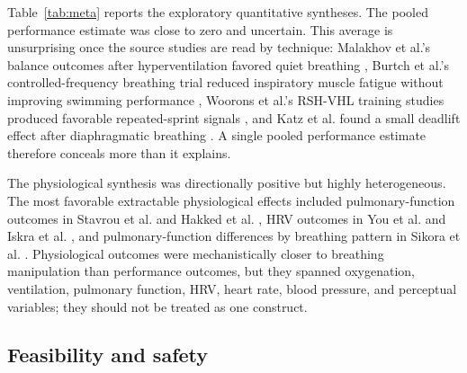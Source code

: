 \documentclass[12pt,a4paper]{article}
\begin{document}
Table~\ref{tab:meta} reports the exploratory quantitative syntheses. The pooled performance estimate was close to zero and uncertain. This average is unsurprising once the source studies are read by technique: Malakhov et al.'s balance outcomes after hyperventilation favored quiet breathing \parencite{malakhov_m_and_makarenkova_e_and_melnikov_a_influence_2014}, Burtch et al.'s controlled-frequency breathing trial reduced inspiratory muscle fatigue without improving swimming performance \parencite{burtch_controlled_2017}, Woorons et al.'s RSH-VHL training studies produced favorable repeated-sprint signals \parencite{woorons_physiological_2019,woorons_x_and_faucher_c_and_dufour_sp_and_brocherie_f_and_robach_p_and_connes_p_and_brugniaux_jv_and_verges_s_and_gaston_af_and_millet_g_and_dupuy_o_and_pichon_a_hypoventilation_2024}, and Katz et al. found a small deadlift effect after diaphragmatic breathing \parencite{katz_ns_and_rossow_lm_and_fahs_ca_acute_2026}. A single pooled performance estimate therefore conceals more than it explains.

The physiological synthesis was directionally positive but highly heterogeneous. The most favorable extractable physiological effects included pulmonary-function outcomes in Stavrou et al. and Hakked et al. \parencite{stavrou_v_and_toubekis_ag_and_karetsi_e_changes_2015,hakked_cs_and_balakrishnan_r_and_krishnamurthy_mn_yogic_2017}, HRV outcomes in You et al. and Iskra et al. \parencite{you_m_and_laborde_s_and_ackermann_s_and_borges_u_and_dosseville_f_and_mosley_e_influence_2024,iskra_m_and_laborde_s_and_poppa_t_and_salvotti_c_and_weinand_e_and_raab_m_and_voigt_l_specifying_2026}, and pulmonary-function differences by breathing pattern in Sikora et al. \parencite{sikora_m_and_mikolajczyk_r_and_lakomy_o_and_karpinski_j_and_zebrowska_a_and_kostorz-nosal_s_and_jastrzebski_d_influence_2024}. Physiological outcomes were mechanistically closer to breathing manipulation than performance outcomes, but they spanned oxygenation, ventilation, pulmonary function, HRV, heart rate, blood pressure, and perceptual variables; they should not be treated as one construct.

\subsection{Feasibility and safety}

\end{document}
